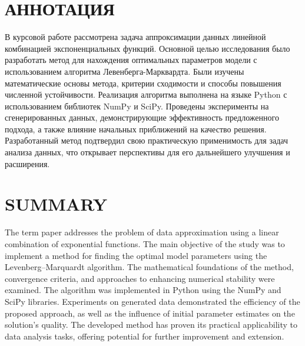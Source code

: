 \section*{АННОТАЦИЯ}
\begin{minipage}[t][0.4\textheight][t]{0.9\linewidth}
	\setlength{\parindent}{1.25cm}
	\indent
	В курсовой работе рассмотрена задача аппроксимации данных линейной комбинацией экспоненциальных функций. Основной целью исследования было разработать метод для нахождения оптимальных параметров модели с использованием алгоритма Левенберга-Марквардта. Были изучены математические основы метода, критерии сходимости и способы повышения численной устойчивости. Реализация алгоритма выполнена на языке Python с использованием библиотек NumPy и SciPy. Проведены эксперименты на сгенерированных данных, демонстрирующие эффективность предложенного подхода, а также влияние начальных приближений на качество решения. Разработанный метод подтвердил свою практическую применимость для задач анализа данных, что открывает перспективы для его дальнейшего улучшения и расширения.
\end{minipage}

\section*{SUMMARY}
\begin{minipage}[t][0.4\textheight][t]{0.9\linewidth}
	\setlength{\parindent}{1.25cm}
	\indent
	The term paper addresses the problem of data approximation using a linear combination of exponential functions. The main objective of the study was to implement a method for finding the optimal model parameters using the Levenberg–Marquardt algorithm. The mathematical foundations of the method, convergence criteria, and approaches to enhancing numerical stability were examined. The algorithm was implemented in Python using the NumPy and SciPy libraries. Experiments on generated data demonstrated the efficiency of the proposed approach, as well as the influence of initial parameter estimates on the solution's quality. The developed method has proven its practical applicability to data analysis tasks, offering potential for further improvement and extension.
\end{minipage}

\newpage

\let \savenumberline \numberline
\def \numberline#1{\savenumberline{#1.}}

\tableofcontents

